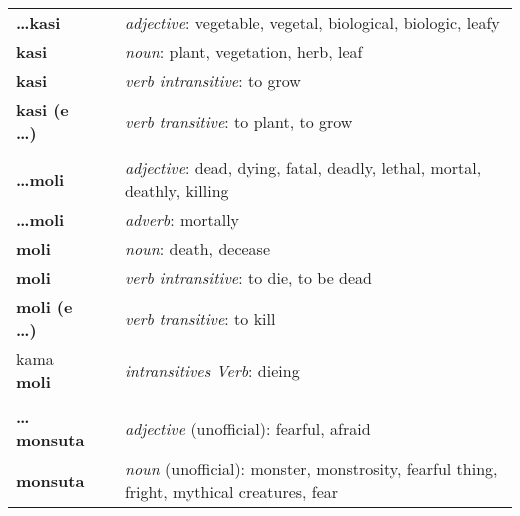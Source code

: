 \begin{supertabular}{p{2,5cm}|ll}
    \textbf{\dots kasi}       &  & \textit{adjective}: vegetable, vegetal, biological, biologic, leafy                               \\ %
    \textbf{kasi}             &  & \textit{noun}: plant, vegetation, herb, leaf                                                      \\ %
    \textbf{kasi}             &  & \textit{verb intransitive}: to grow                                                               \\ %
    \textbf{kasi (e \dots)}   &  & \textit{verb transitive}: to plant, to grow                                                       \\ %
                              &  &                                                                                                   \\ %
    \textbf{\dots moli}       &  & \textit{adjective}: dead, dying, fatal, deadly, lethal, mortal, deathly, killing                  \\ %
    \textbf{\dots moli}       &  & \textit{adverb}: mortally                                                                         \\ %
    \textbf{moli}             &  & \textit{noun}: death, decease                                                                     \\ %
    \textbf{moli}             &  & \textit{verb intransitive}: to die, to be dead                                                    \\ %
    \textbf{moli (e \dots)}   &  & \textit{verb transitive}: to kill                                                                 \\ %
    kama \textbf{moli}        &  & \textit{intransitives Verb}: dieing                                                               \\ %
                              &  &                                                                                                   \\ %
    \textbf{\dots monsuta}    &  & \textit{adjective} (unofficial): fearful, afraid                                                  \\ %
    \textbf{monsuta}          &  & \textit{noun} (unofficial): monster, monstrosity, fearful thing, fright, mythical creatures, fear \\ %

\end{supertabular}
